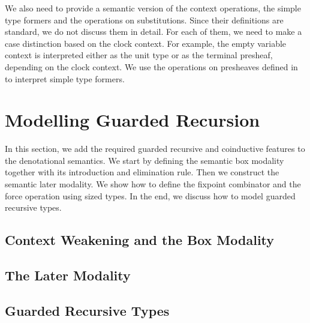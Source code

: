 \documentclass[a4paper,UKenglish,cleveref, autoref,numberwithinsect]{lipics-v2019}
\newcommand{\IC}{\AgdaInductiveConstructor}
\begin{document}
We also need to provide a semantic version of 
the context operations, the simple type formers and the operations on substitutions.
Since their definitions are standard, we do not discuss them in detail.
For each of them, we need to make a case distinction based on the clock context.
For example, the empty variable context \IC{•} is interpreted either as the unit type
or as the terminal presheaf, depending on the clock context.
We use the operations on presheaves defined in  to interpret simple type formers.


\section{Modelling Guarded Recursion}
\label{sec:guarded}
In this section, we add the required guarded
recursive and coinductive features to the denotational semantics.
We start by defining the semantic box modality together with its
introduction and elimination rule. Then we construct the semantic
later modality. We show how to define the fixpoint combinator and the
force operation using sized types. In the end, we discuss how to model
guarded recursive types.

\subsection{Context Weakening and the Box Modality}



\subsection{The Later Modality}
\label{sec:later}




\subsection
{Guarded Recursive Types}
\label{sec:grt}

\end{document}
